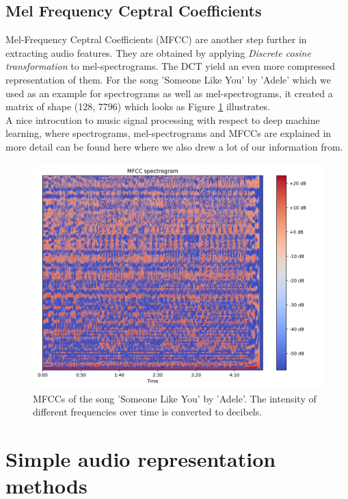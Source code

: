 \subsection{Mel Frequency Ceptral Coefficients}\label{ssec:mfcc_intro}
Mel-Frequency Ceptral Coefficients (MFCC) are another step further in extracting audio features. They are obtained by applying \textit{Discrete cosine transformation} to mel-spectrograms. The DCT yield an even more compressed representation of them. For the song 'Someone Like You' by 'Adele' which we used as an example for spectrograms as well as mel-spectrograms, it created a matrix of shape (128, 7796) which looks as Figure \ref{fig:ilustrative_mfccs} illustrates.\\

A nice introcution to music signal processing with respect to deep machine learning, where spectrograms, mel-spectrograms and MFCCs are explained in more detail can be found here \cite{Schluter2017} where we also drew a lot of our information from.

\begin{figure}[h!]
    \centering
	\includegraphics[width=140mm]{./img/mfccs.png}
	\caption{MFCCs of the song 'Someone Like You' by 'Adele'. The intensity of different frequencies over time is converted to decibels.}
	\label{fig:ilustrative_mfccs}
\end{figure}

\section{Simple audio representation methods}\label{sec:audio_machine_learning}

